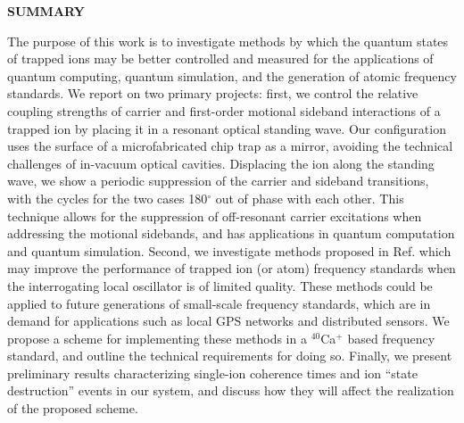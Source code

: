 \clearpage
\begin{centering}
\textbf{SUMMARY}\\
\vspace{\baselineskip}
\end{centering}




The purpose of this work is to investigate methods by which the quantum states of trapped ions may be better controlled and measured for the applications of quantum computing, quantum simulation, and the generation of atomic frequency standards. We report on two primary projects: first, we control the relative coupling strengths of carrier and first-order motional sideband interactions of a trapped ion by placing it in a resonant optical standing wave. Our configuration uses the surface of a microfabricated chip trap as a mirror, avoiding the technical challenges of in-vacuum optical cavities. Displacing the ion along the standing wave, we show a periodic suppression of the carrier and sideband transitions, with the cycles for the two cases 180$^{\circ}$ out of phase with each other. This technique allows for the suppression of off-resonant carrier excitations when addressing the motional sidebands, and has applications in quantum computation and quantum simulation. Second, we investigate methods proposed in Ref. \cite{BorregaardSorensen} which may improve the performance of trapped ion (or atom) frequency standards when the interrogating local oscillator is of limited quality. These methods could be applied to future generations of small-scale frequency standards, which are in demand for applications such as local GPS networks and distributed sensors. We propose a scheme for  implementing these methods in a $^{40}$Ca$^+$ based frequency standard, and outline the technical requirements for doing so. Finally, we present preliminary results characterizing single-ion coherence times and ion ``state destruction'' events in our system, and discuss how they will affect the realization of the proposed scheme. 